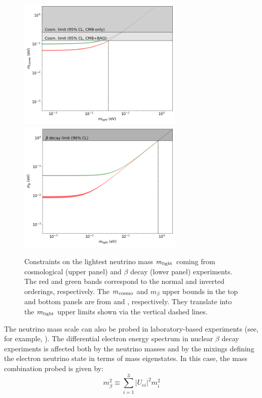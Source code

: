 \begin{figure}[t!b!]
\begin{center}
\includegraphics[width=0.7\textwidth]{img/mcosmovsmlight.png} 
\includegraphics[width=0.7\textwidth]{img/mbetavsmlight.png}
\end{center}
\caption{\label{fig:mass_constraints_cosmo_beta}Constraints on the lightest neutrino mass $m_{\rm light}$ coming from cosmological (upper panel) and $\beta$ decay (lower panel) experiments. The red and green bands correspond to the normal and inverted orderings, respectively. The $m_{{\rm cosmo}}$ and $m_{\beta}$ upper bounds in the top and bottom panels are from \cite{eBOSS:2020yzd} and \cite{KATRIN:2021uub}, respectively. They translate into the $m_{{\rm light}}$ upper limits shown via the vertical dashed lines.}
\end{figure}

The neutrino mass scale can also be probed in laboratory-based experiments (see, for example, \cite{Otten:2008zz}). The differential electron energy spectrum in nuclear $\beta$ decay experiments is affected both by the neutrino masses and by the mixings defining the electron neutrino state in terms of mass eigenstates. In this case, the mass combination probed is given by:
\begin{equation}
m_{\beta}^2\equiv\sum_{i=1}^3\lvert U_{ei}\rvert^2m_i^2
\label{eq:mbeta}
\end{equation}

